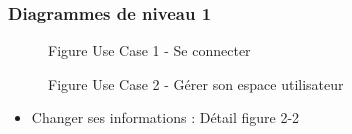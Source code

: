 \documentclass[a4paper, 11pt]{article}
\begin{document}
        \subsubsection{ Diagrammes de niveau 1}
        \begin{figure}[h]
        \caption{Figure Use Case 1 - Se connecter}
        \label{fig-diag-use-case-1}
        \end{figure}
        \begin{figure}[h]
        \caption{Figure Use Case 2 - Gérer son espace utilisateur}
        \label{fig-diag-use-case-2}
        \end{figure}
        \begin{itemize}
        \item Changer ses informations : Détail figure 2-2
        \end{itemize}
        \clearpage
\end{document}

